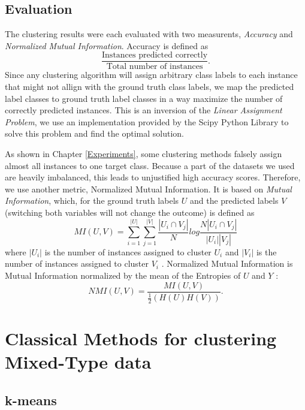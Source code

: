 \subsection{Evaluation}

The clustering results were each evaluated with two measurents, \textit{Accuracy} and \textit{Normalized Mutual Information}. Accuracy is defined as 
$$\frac{\text{Instances predicted correctly}}{\text{Total number of instances}}.$$
Since any clustering algorithm will assign arbitrary class labels to each instance that might not allign with the ground truth class labels, we map the predicted label classes to ground truth label classes in a way maximize the number of correctly predicted instances. This is an inversion of the \textit{Linear Assignment Problem}, we use an implementation provided by the Scipy Python Library \cite{scipy} to solve this problem and find the optimal solution. 

As shown in Chapter \ref{Experiments}, some clustering methods falsely assign almost all instances to one target class. Because a part of the datasets we used are heavily imbalanced, this leads to unjustified high accuracy scores. Therefore, we use another metric, Normalized Mutual Information. It is based on \textit{Mutual Information}, which, for the ground truth labels $U$ and the predicted labels $V$ (switching both variables will not change the outcome) is defined as
$$MI(U,V) = \sum^{|U|}_{i=1}\sum^{|V|}_{j=1} \frac{|U_i \cap V_j|}{N} log\frac{N|U_i \cap V_j|}{|U_i||V_j|}$$
where $|U_i|$ is the number of instances assigned to cluster $U_i$ and $|V_i|$ is the number of instances assigned to cluster $V_i$ \cite{scikit_learn}. Normalized Mutual Information is Mutual Information normalized by the mean of the Entropies of $U$ and $Y$ \cite{scikit_learn}:
$$NMI(U,V) = \frac{MI(U,V)}{\frac{1}{2}(H(U)H(V))}.$$

\section{Classical Methods for clustering Mixed-Type data} \label{Classical Methods for clustering Mixed-Type data}

\subsection{k-means} \label{k-means}

